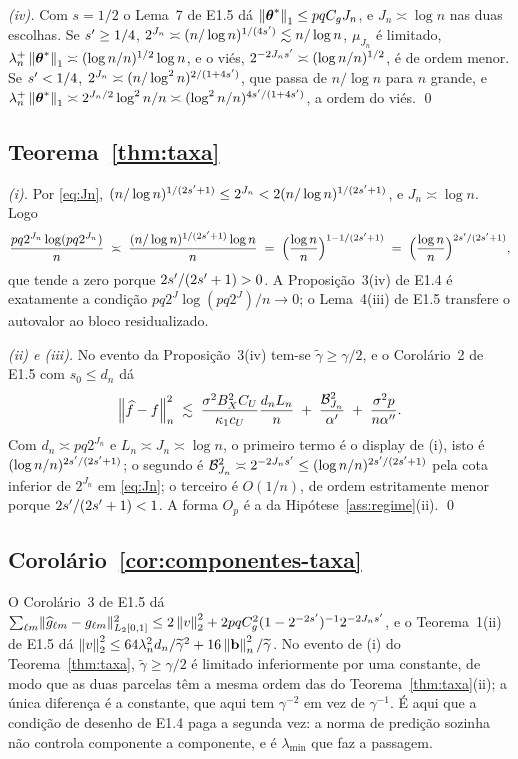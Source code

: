 \documentclass[11pt,a4paper]{article}
\newcommand{\lmin}{\lambda_{\min}}
\newcommand{\bb}{\mathbf{b}}
\newcommand{\gtil}{\widetilde{\gamma}}
\begin{document}
\emph{(iv).} Com $s = 1/2$ o Lema~7 de E1.5 dá $\left\lVert \boldsymbol{\theta}^{*} \right\rVert_{1} \le
pqC_{g}J_{n}$, e $J_{n} \asymp \log n$ nas duas escolhas. Se $s' \ge 1/4$,
$2^{J_{n}} \asymp (n/\log n)^{1/(4s')} \lesssim n/\log n$, $\mu_{J_{n}}$ é
limitado, $\lambda_{n}^{+}\left\lVert \boldsymbol{\theta}^{*} \right\rVert_{1} \asymp (\log n/n)^{1/2}\log n$,
e o viés, $2^{-2J_{n}s'} \asymp (\log n/n)^{1/2}$, é de ordem menor. Se
$s' < 1/4$, $2^{J_{n}} \asymp (n/\log^{2}n)^{2/(1+4s')}$, que passa de
$n/\log n$ para $n$ grande, e $\lambda_{n}^{+}\left\lVert \boldsymbol{\theta}^{*} \right\rVert_{1} \asymp
2^{J_{n}/2}\log^{2}n/n \asymp (\log^{2}n/n)^{4s'/(1+4s')}$, a ordem do
viés. \qed

\subsection*{Teorema~\ref{thm:taxa}}

\emph{(i).} Por \eqref{eq:Jn}, $(n/\log n)^{1/(2s'+1)} \le 2^{J_{n}} <
2(n/\log n)^{1/(2s'+1)}$, e $J_{n} \asymp \log n$. Logo
\[
  \frac{pq2^{J_{n}}\log(pq2^{J_{n}})}{n}
  \;\asymp\; \frac{(n/\log n)^{1/(2s'+1)}\log n}{n}
  \;=\; \Bigl(\frac{\log n}{n}\Bigr)^{1 - 1/(2s'+1)}
  \;=\; \Bigl(\frac{\log n}{n}\Bigr)^{2s'/(2s'+1)},
\]
que tende a zero porque $2s'/(2s'+1) > 0$. A Proposição~3(iv) de E1.4 é
exatamente a condição $pq2^{J}\log(pq2^{J})/n \to 0$; o Lema~4(iii) de E1.5
transfere o autovalor ao bloco residualizado.

\emph{(ii) e (iii).} No evento da Proposição~3(iv) tem-se
$\gtil \ge \gamma/2$, e o Corolário~2 de E1.5 com $s_{0} \le d_{n}$ dá
\[
  \left\lVert \widehat f - f \right\rVert_{n}^{2}
  \;\lesssim\; \frac{\sigma^{2}B_{X}^{2}C_{U}}{\kappa_{1}c_{U}}
  \frac{d_{n}L_{n}}{n}
  \;+\; \frac{\mathcal{B}_{J_{n}}^{2}}{\alpha'}
  \;+\; \frac{\sigma^{2}p}{n\alpha''} .
\]
Com $d_{n} \asymp pq2^{J_{n}}$ e $L_{n} \asymp J_{n} \asymp \log n$, o primeiro
termo é o display de (i), isto é $(\log n/n)^{2s'/(2s'+1)}$; o segundo é
$\mathcal{B}_{J_{n}}^{2} \asymp 2^{-2J_{n}s'} \le
(\log n/n)^{2s'/(2s'+1)}$ pela cota inferior de $2^{J_{n}}$ em
\eqref{eq:Jn}; o terceiro é $O(1/n)$, de ordem estritamente menor porque
$2s'/(2s'+1) < 1$. A forma $O_{p}$ é a da
Hipótese~\ref{ass:regime}(ii). \qed

\subsection*{Corolário~\ref{cor:componentes-taxa}}

O Corolário~3 de E1.5 dá
$\sum_{\ell m}\lVert\widehat g_{\ell m} - g_{\ell m}\rVert_{L_{2}[0,1]}^{2}
\le 2\left\lVert v \right\rVert_{2}^{2} + 2pqC_{g}^{2}(1-2^{-2s'})^{-1}2^{-2J_{n}s'}$, e o
Teorema~1(ii) de E1.5 dá
$\norm{v}_{2}^{2} \le 64\pen_{n}^{2}d_{n}/\gtil^{2} +
16\normn{\bb}^{2}/\gtil$. No evento de (i) do Teorema~\ref{thm:taxa},
$\gtil \ge \gamma/2$ é limitado inferiormente por uma constante, de modo que as
duas parcelas têm a mesma ordem das do Teorema~\ref{thm:taxa}(ii); a única
diferença é a constante, que aqui tem $\gamma^{-2}$ em vez de $\gamma^{-1}$. É
aqui que a condição de desenho de E1.4 paga a segunda vez: a norma de predição
sozinha não controla componente a componente, e é $\lmin$ que faz a passagem.
\end{document}
